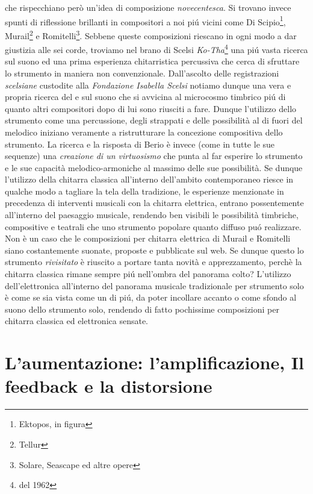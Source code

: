 \documentclass[oneside]{article}
\begin{document}
\begin{multicols*}{2}
che rispecchiano però un'idea di composizione \textit{novecentesca}. Si trovano invece spunti di riflessione brillanti in compositori a noi piú vicini come Di Scipio\footnote{Ektopos, in figura}, Murail\footnote{Tellur} e Romitelli\footnote{Solare, Seascape ed altre opere}. Sebbene queste composizioni riescano in ogni modo a dar giustizia alle sei corde, troviamo nel brano di Scelsi \textit{Ko-Tha}\footnote{del 1962} una piú vasta ricerca sul suono ed una prima esperienza chitarristica percussiva che cerca di sfruttare lo strumento in maniera non convenzionale. Dall'ascolto delle registrazioni \textit{scelsiane} custodite alla \textit{Fondazione Isabella Scelsi} notiamo dunque una vera e propria ricerca del e sul suono che si avvicina al microcosmo timbrico piú di quanto altri compositori dopo di lui sono riusciti a fare. Dunque l'utilizzo dello strumento come una percussione, degli strappati e delle possibilità al di fuori del melodico iniziano veramente a ristrutturare la concezione compositiva dello strumento. La ricerca e la risposta di Berio è invece (come in tutte le sue sequenze) una \textit{creazione di un virtuosismo} che punta al far esperire lo strumento e le sue capacità melodico-armoniche al massimo delle sue possibilità. 
Se dunque l'utilizzo della chitarra classica all'interno dell'ambito contemporaneo riesce in qualche modo a tagliare la tela della tradizione, le esperienze menzionate in precedenza di interventi musicali con la chitarra elettrica, entrano possentemente all'interno del paesaggio musicale, rendendo ben visibili le possibilità timbriche, compositive e teatrali che uno strumento popolare quanto diffuso puó realizzare. Non è un caso che le composizioni per chitarra elettrica di Murail e Romitelli siano costantemente suonate, proposte e pubblicate sul web. 
Se dunque questo lo strumento \textit{rivisitato} è riuscito a portare tanta novità e apprezzamento, perchè la chitarra classica rimane sempre piú nell'ombra del panorama colto?
L'utilizzo dell'elettronica all'interno del panorama musicale tradizionale per strumento solo è come se sia vista come un di piú, da poter incollare accanto o come sfondo al suono dello strumento solo, rendendo di fatto pochissime composizioni per chitarra classica ed elettronica sensate.


\section{ L’aumentazione: l'amplificazione, Il feedback e la distorsione}


\end{multicols*}
\end{document}
